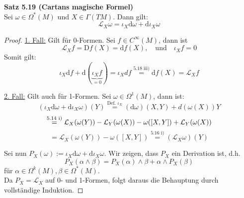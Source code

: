 \documentclass[fleqn, 12pt, letterpaper]{article}
\newcommand{\txt}[1]{\text{#1}}
\begin{document}
\textbf{Satz 5.19 (Cartans magische Formel)}\\
Sei \( \omega \in \Omega^*(M) \) und \( X \in \Gamma(TM) \). Dann gilt:
\[
\mathcal{L}_X \omega = \iota_X \mathrm{d} \omega + \mathrm{d} \iota_X \omega
\]

\begin{proof}
\underline{1. Fall:} Gilt für 0-Formen. Sei \( f \in C^\infty(M) \), dann ist
\[
\mathcal{L}_X f = \mathrm{D}f(X) =\mathrm{d}f(X), \quad \text{und} \quad \iota_X f = 0
\]
Somit gilt:
\[
\iota_X \mathrm{d}f + \mathrm{d}(\underbrace{\iota_X f}_{=0}) = \iota_Xdf \overset{\txt{5.18 iii})}{=} \mathrm{d}f(X) = \mathcal{L}_X f
\]

\underline{2. Fall:} Gilt auch für 1-Formen. Sei \( \omega \in \Omega^1(M) \), dann ist:
\[
(\iota_X \mathrm{d} \omega + \mathrm{d} \iota_X \omega)(Y)
\overset{\txt{Def. }\iota_X}{=} (\mathrm{d} \omega)(X, Y) + d(\omega(X))Y 
\]
\[
\overset{\txt{5.14 i)}}{=}\mathcal{L}_X (\omega(Y))- \mathcal{L}_Y (\omega(X)) - \omega([X,Y]) +\mathcal{L}_Y (\omega(X))\\\]\[
= \mathcal{L}_X (\omega(Y ))- \omega([X,Y])\overset{\txt{5.16 i)}}{=}(\mathcal{L}_X\omega)(Y)
\]

Sei nun \( P_X(\omega) := \iota_X \mathrm{d}\omega + \mathrm{d} \iota_X\omega \). Wir zeigen, dass \( P_X \) ein Derivation ist, d.h.
\[
P_X(\alpha \wedge \beta) = P_X(\alpha) \wedge \beta +  \alpha \wedge P_X(\beta)
\]
für \( \alpha \in \Omega^k(M), \beta \in \Omega^*(M) \).\\

Da \( P_X = \mathcal{L}_X \) auf 0- und 1-Formen, folgt daraus die Behauptung durch vollständige Induktion.


\end{proof}
\end{document}
